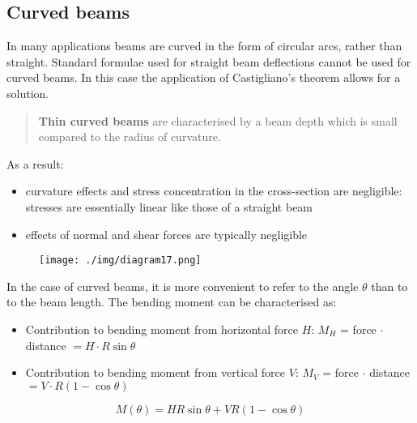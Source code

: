 \subsection{Curved beams}
In many applications beams are curved in the form of circular arcs, rather than straight. Standard formulae used for straight beam deflections cannot be used for curved beams. In this case the application of Castigliano's theorem allows for a solution.
\begin{quotation}
  \textbf{Thin curved beams} are characterised by a beam depth which is small compared to the radius of curvature.
\end{quotation}
As a result:
\begin{itemize}
  \item curvature effects and stress concentration in the cross-section are negligible: stresses are essentially linear like those of a straight beam
  \item effects of normal and shear forces are typically negligible
\end{itemize}
\begin{figure}[H]
  \centering
  \texttt{[image: ./img/diagram17.png]}
  \caption{}
\end{figure}
In the case of curved beams, it is more convenient to refer to the angle $\theta$ than to to the beam length. The bending moment can be characterised as:
\begin{itemize}
  \item Contribution to bending moment from horizontal force $H$: $M_H$ = force $\cdot$ distance $ = H\cdot R \sin{\theta}$
  \item Contribution to bending moment from vertical force $V$: $M_V$ = force $\cdot$ distance $ = V\cdot R \left(1-\cos{\theta}\right)$
\end{itemize}
\begin{equation}
  M(\theta) = HR \sin \theta + VR \left(1-\cos\theta\right)
\end{equation}
